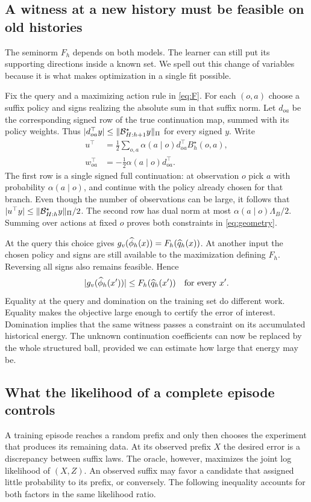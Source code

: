 \subsection{A witness at a new history must be feasible on old histories}
The seminorm $F_h$ depends on both models. The learner can still put its supporting directions inside a known set. We spell out this change of variables because it is what makes optimization in a single fit possible.

Fix the query and a maximizing action rule in \eqref{eq:F}. For each $(o,a)$ choose a suffix policy and signs realizing the absolute sum in that suffix norm. Let $d_{oa}$ be the corresponding signed row of the true continuation map, summed with its policy weights. Thus $|d_{oa}^\top y|\le\lVert \mathcal B^\star_{H:h+1}y\rVert_{\Pi}$ for every signed $y$. Write
\begin{align*}
 u^\top &=\tfrac12\sum_{o,a}\alpha(a\mid o)d_{oa}^\top B_h^\star(o,a),\\
 w_{oa}^\top &=-\tfrac12\alpha(a\mid o)d_{oa}^\top .
\end{align*}
The first row is a single signed full continuation: at observation $o$ pick $a$ with probability $\alpha(a\mid o)$, and continue with the policy already chosen for that branch. Even though the number of observations can be large, it follows that $|u^\top y|\le\lVert \mathcal B^\star_{H:h}y\rVert_{\Pi}/2$. The second row has dual norm at most $\alpha(a\mid o)\Lambda_B/2$. Summing over actions at fixed $o$ proves both constraints in \eqref{eq:geometry}.

At the query this choice gives $g_v(\widehat\phi_h(x))=F_h(\widehat q_h(x))$. At another input the chosen policy and signs are still available to the maximization defining $F_h$. Reversing all signs also remains feasible. Hence
\begin{equation}
 |g_v(\widehat\phi_h(x'))|\le F_h(\widehat q_h(x'))\quad\text{for every }x'.
 \label{eq:global}
\end{equation}
Equality at the query and domination on the training set do different work. Equality makes the objective large enough to certify the error of interest. Domination implies that the same witness passes a constraint on its accumulated historical energy. The unknown continuation coefficients can now be replaced by the whole structured ball, provided we can estimate how large that energy may be.

\subsection{What the likelihood of a complete episode controls}
A training episode reaches a random prefix and only then chooses the experiment that produces its remaining data. At its observed prefix $X$ the desired error is a discrepancy between suffix laws. The oracle, however, maximizes the joint log likelihood of $(X,Z)$. An observed suffix may favor a candidate that assigned little probability to its prefix, or conversely. The following inequality accounts for both factors in the same likelihood ratio.

